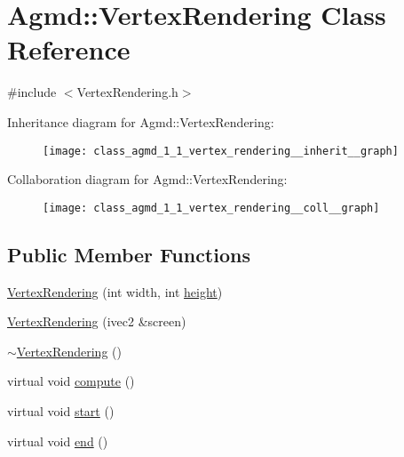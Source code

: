 \hypertarget{class_agmd_1_1_vertex_rendering}{\section{Agmd\+:\+:Vertex\+Rendering Class Reference}
\label{class_agmd_1_1_vertex_rendering}
}


{\ttfamily \#include $<$Vertex\+Rendering.\+h$>$}



Inheritance diagram for Agmd\+:\+:Vertex\+Rendering\+:\nopagebreak
\begin{figure}[H]
\begin{center}
\leavevmode
\texttt{[image: class\_agmd\_1\_1\_vertex\_rendering\_\_inherit\_\_graph]}
\end{center}
\end{figure}


Collaboration diagram for Agmd\+:\+:Vertex\+Rendering\+:\nopagebreak
\begin{figure}[H]
\begin{center}
\leavevmode
\texttt{[image: class\_agmd\_1\_1\_vertex\_rendering\_\_coll\_\_graph]}
\end{center}
\end{figure}
\subsection*{Public Member Functions}
\begin{DoxyCompactItemize}
\item 
\hyperlink{class_agmd_1_1_vertex_rendering_af82c35c66577696f1ac8968ec66539e6}{Vertex\+Rendering} (int width, int \hyperlink{_examples_2_bezier_2_app_8cpp_a48083b65ac9a863566dc3e3fff09a5b4}{height})
\item 
\hyperlink{class_agmd_1_1_vertex_rendering_a5ef8f3f125d66bd5ea71b2a0c6c4394b}{Vertex\+Rendering} (ivec2 \&screen)
\item 
\hyperlink{class_agmd_1_1_vertex_rendering_aaecbb490d6723ca4d09a7e1d9a53628d}{$\sim$\+Vertex\+Rendering} ()
\item 
virtual void \hyperlink{class_agmd_1_1_vertex_rendering_a380d35675521fa7b1b739c1c1214c882}{compute} ()
\item 
virtual void \hyperlink{class_agmd_1_1_vertex_rendering_ac03dd545b910070c14d4c478e2c6d936}{start} ()
\item 
virtual void \hyperlink{class_agmd_1_1_vertex_rendering_accf6f94aa1d549e225c8ca28607b35e0}{end} ()
\end{DoxyCompactItemize}
